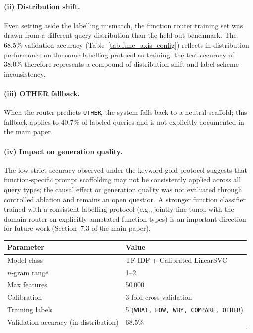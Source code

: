 \documentclass[a4paper,fleql,doubleblind]{cas-sc}
\begin{document}
\paragraph{(ii) Distribution shift.}
Even setting aside the labelling mismatch, the function router training set was
drawn from a different query distribution than the held-out benchmark.
The 68.5\% validation accuracy (Table~\ref{tab:func_axis_config}) reflects
in-distribution performance on the same labelling protocol as training;
the test accuracy of 38.0\% therefore represents a compound of distribution
shift and label-scheme inconsistency.

\paragraph{(iii) OTHER fallback.}
When the router predicts \texttt{OTHER}, the system falls back to a neutral
scaffold; this fallback applies to 40.7\% of labeled queries and is not
explicitly documented in the main paper.

\paragraph{(iv) Impact on generation quality.}
The low strict accuracy observed under the keyword-gold protocol suggests that
function-specific prompt scaffolding may not be consistently applied across all
query types; the causal effect on generation quality was not evaluated through
controlled ablation and remains an open question.
A stronger function classifier trained with a consistent labelling protocol
(e.g., jointly fine-tuned with the domain router on explicitly annotated
function types) is an important direction for future work
(Section~7.3 of the main paper).

\begin{center}
\begingroup
{}
\label{tab:func_axis_config}
\renewcommand{\arraystretch}{1.2}
\begin{tabular}{ll}
\toprule
\textbf{Parameter} & \textbf{Value} \\
\midrule
Model class & TF-IDF + Calibrated LinearSVC \\
$n$-gram range & 1--2 \\
Max features & 50\,000 \\
Calibration & 3-fold cross-validation \\
Training labels & 5 (\texttt{WHAT, HOW, WHY, COMPARE, OTHER}) \\
Validation accuracy (in-distribution) & 68.5\% \\
\bottomrule
\end{tabular}
\endgroup
\end{center}
\end{document}
